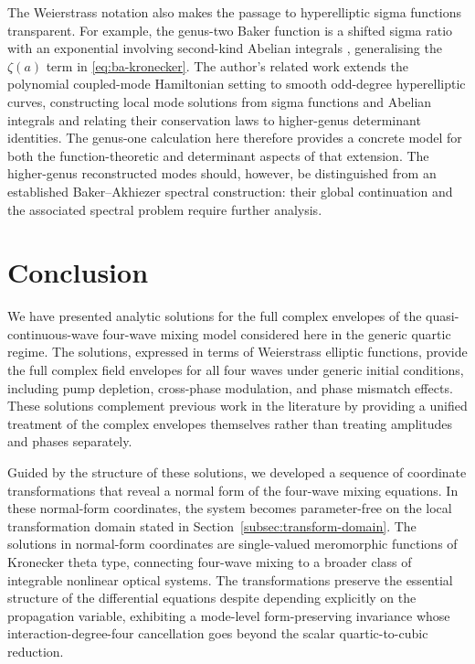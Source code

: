 \documentclass[11pt,a4paper]{article}
\numberwithin{equation}{section}
\begin{document}
The Weierstrass notation also makes the passage to hyperelliptic sigma functions transparent.
For example, the genus-two Baker function is a shifted sigma ratio with an exponential involving second-kind Abelian integrals \cite[Eq.~(3.3)]{bradenBilinearRecurrencesAddition2005}, generalising the $\zeta(a)$ term in \eqref{eq:ba-kronecker}.
The author's related work \cite{zotero-item-855} extends the polynomial coupled-mode Hamiltonian setting to smooth odd-degree hyperelliptic curves, constructing local mode solutions from sigma functions and Abelian integrals and relating their conservation laws to higher-genus determinant identities.
The genus-one calculation here therefore provides a concrete model for both the function-theoretic and determinant aspects of that extension.
The higher-genus reconstructed modes should, however, be distinguished from an established Baker--Akhiezer spectral construction: their global continuation and the associated spectral problem require further analysis.

\section{Conclusion}

We have presented analytic solutions for the full complex envelopes of the quasi-continuous-wave four-wave mixing model considered here in the generic quartic regime.
The solutions, expressed in terms of Weierstrass elliptic functions, provide the full complex field envelopes for all four waves under generic initial conditions, including pump depletion, cross-phase modulation, and phase mismatch effects.
These solutions complement previous work in the literature by providing a unified treatment of the complex envelopes themselves rather than treating amplitudes and phases separately.

Guided by the structure of these solutions, we developed a sequence of coordinate transformations that reveal a normal form of the four-wave mixing equations.
In these normal-form coordinates, the system becomes parameter-free on the local transformation domain stated in Section~\ref{subsec:transform-domain}.
The solutions in normal-form coordinates are single-valued meromorphic functions of Kronecker theta type, connecting four-wave mixing to a broader class of integrable nonlinear optical systems.
The transformations preserve the essential structure of the differential equations despite depending explicitly on the propagation variable, exhibiting a mode-level form-preserving invariance whose interaction-degree-four cancellation goes beyond the scalar quartic-to-cubic reduction.
\end{document}
